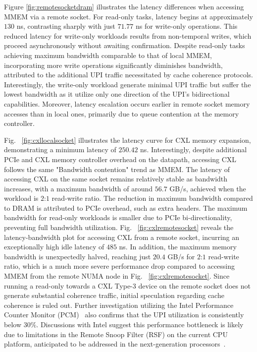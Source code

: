 Figure \ref{fig:remotesocketdram} illustrates the latency differences when accessing MMEM via a remote socket. For read-only tasks, latency begins at approximately $130$ ns, contrasting sharply with just $71.77$ ns for write-only operations. This reduced latency for write-only workloads results from non-temporal writes, which proceed asynchronously without awaiting confirmation. Despite read-only tasks achieving maximum bandwidth comparable to that of local MMEM, incorporating more write operations significantly diminishes bandwidth, attributed to the additional UPI traffic necessitated by cache coherence protocols. Interestingly, the write-only workload generate minimal UPI traffic but suffer the lowest bandwidth as it utilize only one direction of the UPI's bidirectional capabilities. Moreover, latency escalation occurs earlier in remote socket memory accesses than in local ones, primarily due to queue contention at the memory controller.

Fig. ~\ref{fig:cxllocalsocket} illustrates the latency curve for CXL memory expansion, demonstrating a minimum latency of $250.42$ ns. Interestingly, despite additional PCIe and CXL memory controller overhead on the datapath, accessing CXL follows the same "Bandwidth contention" trend as MMEM. The latency of accessing CXL on the same socket remains relatively stable as bandwidth increases, with a maximum bandwidth of around $56.7$ GB/s, achieved when the workload is $2$:$1$ read-write ratio. The reduction in maximum bandwidth compared to DRAM is attributed to PCIe overhead, such as extra headers. The maximum bandwidth for read-only workloads is smaller due to PCIe bi-directionality, preventing full bandwidth utilization. Fig. ~\ref{fig:cxlremotesocket} reveals the latency-bandwidth plot for accessing CXL from a remote socket, incurring an exceptionally high idle latency of $485$ ns. In addition, the maximum memory bandwidth is unexpectedly halved, reaching just $20.4$ GB/s for $2$:$1$ read-write ratio, which is a much more severe performance drop compared to accessing MMEM from the remote NUMA node in Fig. ~\ref{fig:cxlremotesocket}. Since running a read-only towards a CXL Type-3 device on the remote socket does not generate substantial coherence traffic, initial speculation regarding cache coherence is ruled out. Further investigation utilizing the Intel Performance Counter Monitor (PCM)~\cite{pcm} also confirms that the UPI utilization is consistently below $30\%$.
Discussions with Intel suggest this performance bottleneck is likely due to limitations in the Remote Snoop Filter (RSF) on the current CPU platform, anticipated to be addressed in the next-generation processors~\cite{emerald_rapids}.



